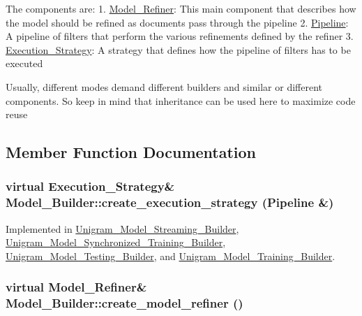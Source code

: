 The components are: 1. \hyperlink{class_model___refiner}{Model\_\-Refiner}: This main component that describes how the model should be refined as documents pass through the pipeline 2. \hyperlink{class_pipeline}{Pipeline}: A pipeline of filters that perform the various refinements defined by the refiner 3. \hyperlink{class_execution___strategy}{Execution\_\-Strategy}: A strategy that defines how the pipeline of filters has to be executed

Usually, different modes demand different builders and similar or different components. So keep in mind that inheritance can be used here to maximize code reuse 

\subsection{Member Function Documentation}
\hypertarget{class_model___builder_a52e9a4125b917b015f13c709ddef3a88}{
\subsubsection[{create\_\-execution\_\-strategy}]{\setlength{\rightskip}{0pt plus 5cm}virtual {\bf Execution\_\-Strategy}\& Model\_\-Builder::create\_\-execution\_\-strategy ({\bf Pipeline} \&)}}
\label{class_model___builder_a52e9a4125b917b015f13c709ddef3a88}


Implemented in \hyperlink{class_unigram___model___streaming___builder_abd9759893f1f7da00cf5b4b1abc68064}{Unigram\_\-Model\_\-Streaming\_\-Builder}, \hyperlink{class_unigram___model___synchronized___training___builder_a756ac51fbf24f5c0381dfe402ee53ef0}{Unigram\_\-Model\_\-Synchronized\_\-Training\_\-Builder}, \hyperlink{class_unigram___model___testing___builder_a934d4e14760ff82eeae8165f9c628a95}{Unigram\_\-Model\_\-Testing\_\-Builder}, and \hyperlink{class_unigram___model___training___builder_a7115521792cd0262b3bf99de8474420d}{Unigram\_\-Model\_\-Training\_\-Builder}.

\hypertarget{class_model___builder_abc7e4f108067afb34fb8c0fc305b06ea}{
\subsubsection[{create\_\-model\_\-refiner}]{\setlength{\rightskip}{0pt plus 5cm}virtual {\bf Model\_\-Refiner}\& Model\_\-Builder::create\_\-model\_\-refiner ()}}
\label{class_model___builder_abc7e4f108067afb34fb8c0fc305b06ea}


